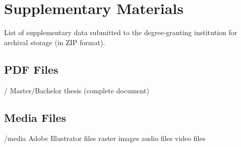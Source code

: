 \chapter{Supplementary Materials}
\label{app:materials}


List of supplementary data submitted to the degree-granting institution for archival storage
(in ZIP format).


\section{PDF Files}
\begin{FileList}{/}
 Master/Bachelor thesis (complete document)
\end{FileList}

\section{Media Files}
\begin{FileList}{/media}
 Adobe Illustrator files
 raster images
 audio files
 video files
\end{FileList}






